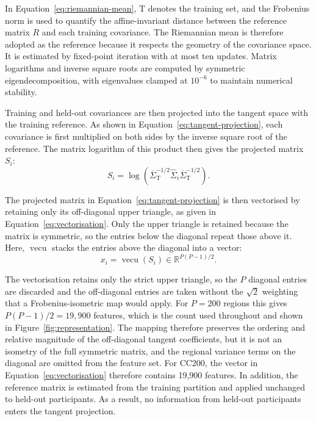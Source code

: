 In Equation~\eqref{eq:riemannian-mean}, $\mathrm{T}$ denotes the training set, and the Frobenius norm is used to quantify the affine-invariant distance between the reference matrix $R$ and each training covariance. The Riemannian mean is therefore adopted as the reference because it respects the geometry of the covariance space. It is estimated by fixed-point iteration with at most ten updates. Matrix logarithms and inverse square roots are computed by symmetric eigendecomposition, with eigenvalues clamped at $10^{-6}$ to maintain numerical stability.

Training and held-out covariances are then projected into the tangent space with the
training reference. As shown in Equation~\eqref{eq:tangent-projection}, each covariance is first multiplied
on both sides by the inverse square root of the reference. The matrix logarithm of this
product then gives the projected matrix $S_i$:
\begin{equation}
S_i
=
\log\!\left(
\overline{\Sigma}_{\mathrm{T}}^{-1/2}
\widehat{\Sigma}_i
\overline{\Sigma}_{\mathrm{T}}^{-1/2}
\right).
\label{eq:tangent-projection}
\end{equation}

The projected matrix in Equation~\eqref{eq:tangent-projection} is then vectorised by retaining only its
off-diagonal upper triangle, as given in Equation~\eqref{eq:vectorisation}. Only the upper triangle is
retained because the matrix is symmetric, so the entries below the diagonal repeat those
above it. Here, $\operatorname{vecu}$ stacks the entries above the diagonal into a vector:
\begin{equation}
x_i
=
\operatorname{vecu}(S_i)
\in
\mathbb{R}^{P(P-1)/2}.
\label{eq:vectorisation}
\end{equation}

The vectorisation retains only the strict upper triangle, so the $P$ diagonal entries are discarded and the off-diagonal entries are taken without the $\sqrt{2}$ weighting that a Frobenius-isometric map would apply. For $P=200$ regions this gives $P(P-1)/2=19{,}900$ features, which is the count used throughout and shown in Figure~\ref{fig:representation}. The mapping therefore preserves the ordering and relative magnitude of the off-diagonal tangent coefficients, but it is not an isometry of the full symmetric matrix, and the regional variance terms on the diagonal are omitted from the feature set. For CC200, the vector in Equation~\eqref{eq:vectorisation} therefore contains 19,900 features. In
addition, the reference matrix is estimated from the training partition and applied
unchanged to held-out participants. As a result, no information from held-out
participants enters the tangent projection.

